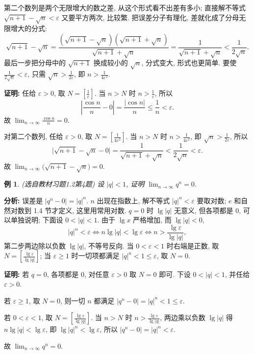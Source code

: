 \documentclass[UTF8,openany]{ctexbook}
\theoremstyle{chinesetextbook}
\newtheorem{example}{例}[section]
\newenvironment{cnproof}{\par\indent\textbf{证明:} \ignorespaces}{\par}
\begin{document}
第二个数列是两个无限增大的数之差, 从这个形式看不出差有多小; 直接解不等式 $\sqrt{n+1}-\sqrt n<\varepsilon$ 又要平方两次, 比较繁. 把误差分子有理化, 差就化成了分母无限增大的分式:
\[
\sqrt{n+1}-\sqrt n=\frac{(\sqrt{n+1}-\sqrt n)(\sqrt{n+1}+\sqrt n)}{\sqrt{n+1}+\sqrt n}=\frac1{\sqrt{n+1}+\sqrt n}<\frac1{2\sqrt n}.
\]
最后一步把分母中的 $\sqrt{n+1}$ 换成较小的 $\sqrt n$, 分式变大, 形式也更简单. 要使 $\displaystyle\frac1{2\sqrt n}<\varepsilon$, 只需 $\displaystyle\sqrt n>\frac1{2\varepsilon}$, 即 $\displaystyle n>\frac1{4\varepsilon^2}$.
\begin{cnproof}
任给 $\varepsilon>0$, 取 $\displaystyle N=\left[\frac1\varepsilon\right]$. 当 $n>N$ 时 $\displaystyle n>\frac1\varepsilon$, 所以
\[
\left|\frac{\cos n}n-0\right|=\frac{|\cos n|}n\le\frac1n<\varepsilon.
\]
故 $\displaystyle\lim_{n\to\infty}\frac{\cos n}n=0$.

对第二个数列, 任给 $\varepsilon>0$, 取 $\displaystyle N=\left[\frac1{4\varepsilon^2}\right]$. 当 $n>N$ 时 $\displaystyle n>\frac1{4\varepsilon^2}$, 即 $\displaystyle\sqrt n>\frac1{2\varepsilon}$, 所以
\[
\bigl|\sqrt{n+1}-\sqrt n-0\bigr|=\frac1{\sqrt{n+1}+\sqrt n}<\frac1{2\sqrt n}<\varepsilon.
\]
故 $\displaystyle\lim_{n\to\infty}\bigl(\sqrt{n+1}-\sqrt n\bigr)=0$.
\end{cnproof}
\begin{example}\label{ex:h12-4}
\textnormal{(选自教材习题1.2第4题)} 设 $|q|<1$, 证明 $\displaystyle\lim_{n\to\infty}q^n=0$.
\end{example}
\par\indent\textbf{分析:} 误差是 $|q^n-0|=|q|^n$. $n$ 出现在指数上, 解不等式 $|q|^n<\varepsilon$ 要取对数; $e$ 和自然对数到 1.4 节才定义, 这里用常用对数. $q=0$ 时 $\lg|q|$ 无意义, 但各项都是 $0$, 可以单独说明; 下面设 $0<|q|<1$. 由于 $\lg x$ 严格增加, 而 $\lg|q|<0$,
\[
|q|^n<\varepsilon\iff n\lg|q|<\lg\varepsilon\iff n>\frac{\lg\varepsilon}{\lg|q|},
\]
第二步两边除以负数 $\lg|q|$, 不等号反向. 当 $0<\varepsilon<1$ 时右端是正数, 取 $\displaystyle N=\left[\frac{\lg\varepsilon}{\lg|q|}\right]$; 当 $\varepsilon\ge1$ 时一切项都满足 $|q|^n<1\le\varepsilon$, 取 $N=0$.
\begin{cnproof}
若 $q=0$, 各项都是 $0$, 对任意 $\varepsilon>0$ 取 $N=0$ 即可. 下设 $0<|q|<1$, 并任给 $\varepsilon>0$.

若 $\varepsilon\ge1$, 取 $N=0$, 则一切 $n$ 都满足 $|q^n-0|=|q|^n<1\le\varepsilon$.

若 $0<\varepsilon<1$, 取 $\displaystyle N=\left[\frac{\lg\varepsilon}{\lg|q|}\right]$. 当 $n>N$ 时 $\displaystyle n>\frac{\lg\varepsilon}{\lg|q|}$, 两边乘以负数 $\lg|q|$ 得 $n\lg|q|<\lg\varepsilon$, 即 $\lg|q|^n<\lg\varepsilon$, 所以 $|q^n-0|=|q|^n<\varepsilon$.

故 $\displaystyle\lim_{n\to\infty}q^n=0$.
\end{cnproof}
\end{document}

